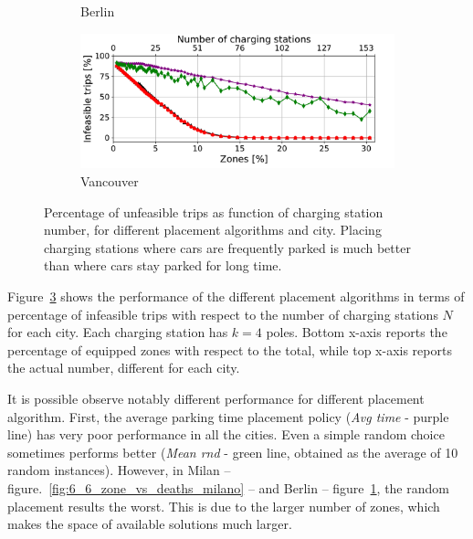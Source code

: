 \begin{figure}[t!]
\begin{center}
\begin{subfigure}{0.49\textwidth}
			\caption{Berlin}
			\label{fig:6_6_zone_vs_deaths_berlino}
		\end{subfigure}
		\begin{subfigure}{0.49\textwidth}
			\includegraphics[width=\columnwidth]{figures/Vancouver_zonesVsDeaths_algorithms_acs-4_tt-25_policy-FreeFloating.pdf}
			\caption{Vancouver}
			\label{fig:6_6_zone_vs_deaths_vancouver}
		\end{subfigure}         
		\caption{Percentage of unfeasible trips as function of charging station number, for different placement algorithms and city. Placing charging stations where cars are frequently parked is much better than where cars stay parked for long time.}
		\label{fig:6_6_deathsVsZones_algorithm}
	\end{center}
\end{figure}


Figure~\ref{fig:6_6_deathsVsZones_algorithm} shows the performance of the different placement algorithms in terms of percentage of infeasible trips  with respect to  the number of charging stations $N$ for each city. Each charging station has $k=4$ poles. Bottom x-axis reports the percentage of equipped zones with respect to the total, while top x-axis reports the actual number, different for each city.

It is possible observe notably different performance for different placement algorithm. First, the average parking time placement policy (\textit{Avg time} - purple line) has very poor performance in all the cities. Even a simple random choice sometimes performs better (\textit{Mean rnd} - green line, obtained as the average of 10 random instances). However, in Milan -- figure.~\ref{fig:6_6_zone_vs_deaths_milano} -- and Berlin -- figure~\ref{fig:6_6_zone_vs_deaths_berlino}, the random placement results the worst. This is due to the larger number of zones, which makes the space of available solutions much larger.

